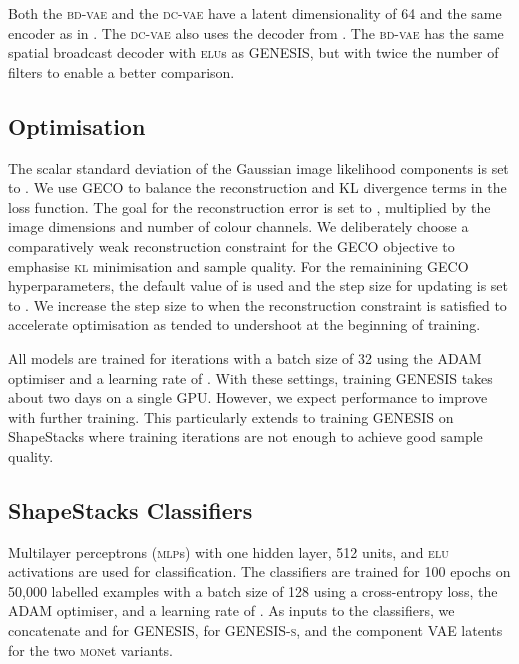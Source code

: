 \documentclass{article}
\begin{document}
Both the \textsc{bd-vae} and the \textsc{dc-vae} have a latent dimensionality of 64 and the same encoder as in \citet{berg2018sylvester}.
The \textsc{dc-vae} also uses the decoder from  \citet{berg2018sylvester}.
The \textsc{bd-vae} has the same spatial broadcast decoder with \textsc{elu}s as \gls{GENESIS}, but with twice the number of filters to enable a better comparison.


\subsection{Optimisation}

The scalar standard deviation of the Gaussian image likelihood components is set to .
We use \gls{GECO} \citep{rezende2018taming} to balance the reconstruction and KL divergence terms in the loss function.
The goal for the reconstruction error is set to , multiplied by the image dimensions and number of colour channels.
We deliberately choose a comparatively weak reconstruction constraint for the \gls{GECO} objective to emphasise \textsc{kl} minimisation and sample quality.
For the remainining \gls{GECO} hyperparameters, the default value of  is used and the step size for updating  is set to .
We increase the step size to  when the reconstruction constraint is satisfied to accelerate optimisation as  tended to undershoot at the beginning of training.

All models are trained for  iterations with a batch size of 32 using the \gls{ADAM} optimiser \citep{kingma2014adam} and a learning rate of .
With these settings, training \gls{GENESIS} takes about two days on a single GPU.
However, we expect performance to improve with further training.
This particularly extends to training \gls{GENESIS} on ShapeStacks where  training iterations are not enough to achieve good sample quality.


\subsection{ShapeStacks Classifiers}
\label{app:classifiers}

Multilayer perceptrons (\textsc{mlp}s) with one hidden layer, 512 units, and \textsc{elu} activations are used for classification.
The classifiers are trained for 100 epochs on 50,000 labelled examples with a batch size of 128 using a cross-entropy loss, the \gls{ADAM} optimiser, and a learning rate of .
As inputs to the classifiers, we concatenate  and  for \gls{GENESIS},  for \gls{GENESIS}\textsc{-s}, and the component \gls{VAE} latents for the two \textsc{mon}et variants.
\end{document}

